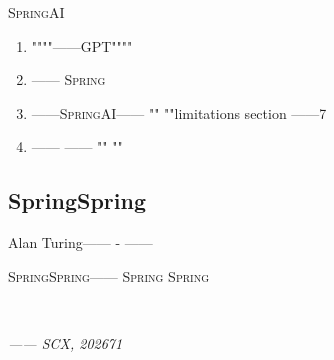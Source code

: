 \documentclass[12pt,a4paper]{article}
\theoremstyle{remark}
\newcommand{\Spring}{\textsc{Spring}}
\begin{document}
\begin{center}
\\[4pt]
\end{center}

\subsection{}

\Spring{}AI

\begin{enumerate}[label=(\arabic*), itemsep=4pt]
    \item \textbf{}
    
    """"——GPT""""
    
    
    \item \textbf{}
    
    ——
    \Spring{}
    
    \item \textbf{}
    ——\Spring{}AI——
    ""
    ""limitations section
    ——7
    
    \item \textbf{}
    ——
    ——
    ""
    ""
\end{enumerate}

\subsection{SpringSpring}

Alan Turing——
-
——
\textbf{}

\Spring{}\Spring{}——
\Spring{}\textbf{}
\Spring{}


\begin{center}
\\[8pt]
\boxed{\text{}}
\end{center}

\vspace{12pt}

\begin{flushright}
\textit{—— SCX, 202671}
\end{flushright}

\newpage

\section*{}
\end{document}
